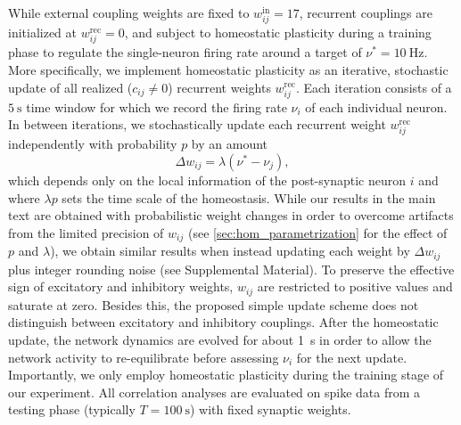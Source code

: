 While external coupling weights are fixed to $w_{ij}^\mathrm{in} = 17$, recurrent couplings are initialized at $w_{ij}^\mathrm{rec} = 0$, and subject to homeostatic plasticity during a training phase to regulate the single-neuron firing rate around a target of $\nu^\ast=\SI{10}{\hertz}$.
More specifically, we implement homeostatic plasticity as an iterative, stochastic update of all realized ($c_{ij}\neq 0$) recurrent weights $w^\mathrm{rec}_{ij}$.
Each iteration consists of a $\SI{5}{\second}$ time window for which we record the firing rate $\nu_i$ of each individual neuron.
In between iterations, we stochastically update each recurrent weight $w^\mathrm{rec}_{ij}$ independently with probability $p$ by an amount
\begin{equation}
	\Delta w_{ij} = \lambda(\nu^\ast-\nu_j),
	\label{eq:rule}
\end{equation}
which depends only on the local information of the post-synaptic neuron $i$ and where $\lambda p$ sets the time scale of the homeostasis.
While our results in the main text are obtained with probabilistic weight changes in order to overcome artifacts from the limited precision of $w_{ij}$ (see \cref{sec:hom_parametrization} for the effect of $p$ and $\lambda$), we obtain similar results when instead updating each weight by $\Delta w_{ij}$ plus integer rounding noise (see Supplemental Material).
To preserve the effective sign of excitatory and inhibitory weights, $w_{ij}$ are restricted to positive values and saturate at zero.
Besides this, the proposed simple update scheme does not distinguish between excitatory and inhibitory couplings.
After the homeostatic update, the network dynamics are evolved for about \SI{1}{\second} in order to allow the network activity to re-equilibrate before assessing $\nu_i$ for the next update.
Importantly, we only employ homeostatic plasticity during the training stage of our experiment.
All correlation analyses are evaluated on spike data from a testing phase (typically $T=\SI{100}{\second}$) with fixed synaptic weights.




